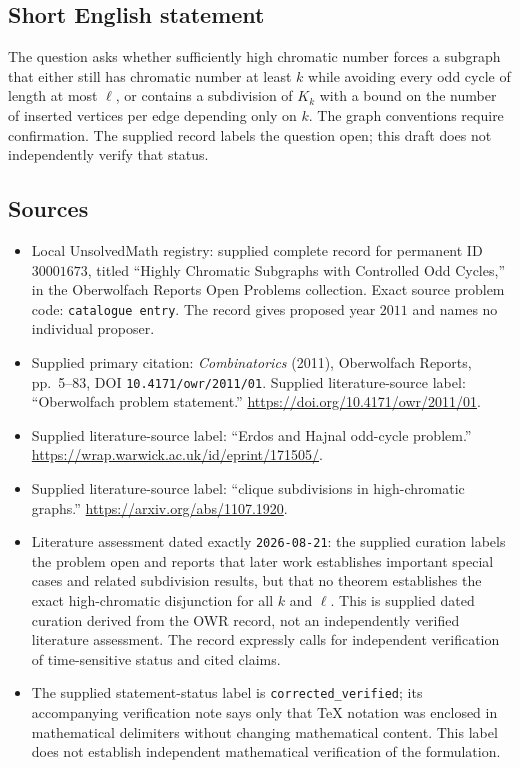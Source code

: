 \documentclass[11pt]{article}
\begin{document}
\subsection{Short English statement}
The question asks whether sufficiently high chromatic number forces a subgraph that either still has chromatic number at least \(k\) while avoiding every odd cycle of length at most \(\ell\), or contains a subdivision of \(K_k\) with a bound on the number of inserted vertices per edge depending only on \(k\). The graph conventions require confirmation. The supplied record labels the question open; this draft does not independently verify that status.
\subsection{Sources}
\begin{itemize}
\item Local UnsolvedMath registry: supplied complete record for permanent ID \(30001673\), titled ``Highly Chromatic Subgraphs with Controlled Odd Cycles,'' in the Oberwolfach Reports Open Problems collection. Exact source problem code: \texttt{catalogue entry}. The record gives proposed year \(2011\) and names no individual proposer.
\item Supplied primary citation: \emph{Combinatorics} (2011), Oberwolfach Reports, pp.\ 5--83, DOI \texttt{10.4171/owr/2011/01}. Supplied literature-source label: ``Oberwolfach problem statement.'' \url{https://doi.org/10.4171/owr/2011/01}.
\item Supplied literature-source label: ``Erdos and Hajnal odd-cycle problem.'' \url{https://wrap.warwick.ac.uk/id/eprint/171505/}.
\item Supplied literature-source label: ``clique subdivisions in high-chromatic graphs.'' \url{https://arxiv.org/abs/1107.1920}.
\item Literature assessment dated exactly \texttt{2026-08-21}: the supplied curation labels the problem open and reports that later work establishes important special cases and related subdivision results, but that no theorem establishes the exact high-chromatic disjunction for all \(k\) and \(\ell\). This is supplied dated curation derived from the OWR record, not an independently verified literature assessment. The record expressly calls for independent verification of time-sensitive status and cited claims.
\item The supplied statement-status label is \texttt{corrected\_verified}; its accompanying verification note says only that TeX notation was enclosed in mathematical delimiters without changing mathematical content. This label does not establish independent mathematical verification of the formulation.
\end{itemize}
\end{document}
